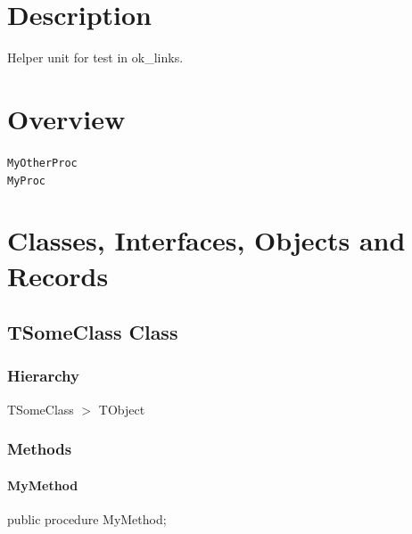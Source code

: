 \documentclass{report}
\begin{document}
\section{Description}
Helper unit for test in ok{\_}links.
\section{Overview}
\begin{description}
\item[\texttt{\begin{ttfamily}TSomeClass\end{ttfamily} Class}]
\item[\texttt{\begin{ttfamily}TSomeOtherClass\end{ttfamily} Class}]
\end{description}
\begin{description}
\item[\texttt{MyOtherProc}]
\item[\texttt{MyProc}]
\end{description}
\section{Classes, Interfaces, Objects and Records}
\subsection*{TSomeClass Class}
\subsubsection*{\large{\textbf{Hierarchy}}\normalsize\hspace{1ex}\hfill}
TSomeClass {$>$} TObject
\subsubsection*{\large{\textbf{Methods}}\normalsize\hspace{1ex}\hfill}
\paragraph*{MyMethod}\hspace*{\fill}

\begin{list}{}{
\setlength{\itemindent}{0cm}
\setlength{\listparindent}{0cm}
\setlength{\leftmargin}{\evensidemargin}
\addtolength{\leftmargin}{\tmplength}
\settowidth{\labelsep}{X}
\addtolength{\leftmargin}{\labelsep}
\setlength{\labelwidth}{\tmplength}
}
\begin{flushleft}
\item[\textbf{Declaration}\hfill]
\begin{ttfamily}
public procedure MyMethod;\end{ttfamily}


\end{flushleft}
\end{list}
\end{document}
